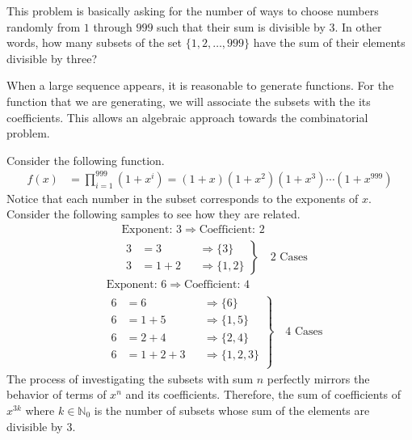 \documentclass[../../main.tex]{subfiles}
\begin{document}
\begin{solution}
This problem is basically asking for the number of ways to choose
numbers randomly from $1$ through $999$ such that their sum is
divisible by $3$. In other words, how many subsets of the set
$\{1, 2, \ldots, 999\}$ have the sum of their elements divisible by
three?

When a large sequence appears, it is reasonable to generate functions.
For the function that we are generating, we will associate the subsets
with the its coefficients. This allows an algebraic approach towards
the combinatorial problem.

Consider the following function.
\begin{align*}
    f(x)
    &= \prod_{i=1}^{999} \left( 1 + x^i \right)
    = (1 + x) \left( 1 + x^2 \right) \left( 1 + x^3 \right) \cdots
        \left( 1 + x^{999} \right)
\end{align*}
Notice that each number in the subset corresponds to the exponents of
$x$. Consider the following samples to see how they are related.
\begin{align*}
    &\text{Exponent: $3$} \Rightarrow \text{Coefficient: $2$} \\
    &\left.\begin{aligned}
        3 &= 3 &&\Rightarrow \{ 3 \} \\
        3 &= 1 + 2 &&\Rightarrow \{ 1, 2 \}
    \end{aligned}\right\}
    \quad \text{2 Cases}
\end{align*}
\begin{align*}
    &\text{Exponent: $6$} \Rightarrow \text{Coefficient: $4$} \\
    &\left.\begin{aligned}
        6 &= 6 &&\Rightarrow \{ 6 \} \\
        6 &= 1 + 5 &&\Rightarrow \{ 1, 5 \} \\
        6 &= 2 + 4 &&\Rightarrow \{ 2, 4 \} \\
        6 &= 1 + 2 + 3 &&\Rightarrow \{ 1, 2, 3 \} \\
    \end{aligned}\right\}
    \quad \text{4 Cases}
\end{align*}
The process of investigating the subsets with sum $n$ perfectly
mirrors the behavior of terms of $x^n$ and its coefficients.
Therefore, the sum of coefficients of $x^{3k}$ where
$k \in \mathbb{N}_0$ is the number of subsets whose sum of the
elements are divisible by $3$.


\end{solution}
\end{document}
